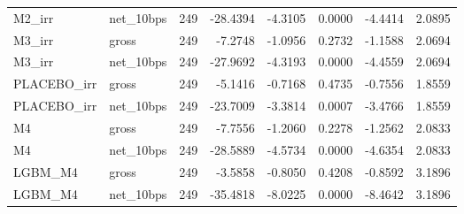\begin{tabular}{llrrrrrr}
M2\_irr & net\_10bps & 249 & -28.4394 & -4.3105 & 0.0000 & -4.4414 & 2.0895 \\
M3\_irr & gross & 249 & -7.2748 & -1.0956 & 0.2732 & -1.1588 & 2.0694 \\
M3\_irr & net\_10bps & 249 & -27.9692 & -4.3193 & 0.0000 & -4.4559 & 2.0694 \\
PLACEBO\_irr & gross & 249 & -5.1416 & -0.7168 & 0.4735 & -0.7556 & 1.8559 \\
PLACEBO\_irr & net\_10bps & 249 & -23.7009 & -3.3814 & 0.0007 & -3.4766 & 1.8559 \\
M4 & gross & 249 & -7.7556 & -1.2060 & 0.2278 & -1.2562 & 2.0833 \\
M4 & net\_10bps & 249 & -28.5889 & -4.5734 & 0.0000 & -4.6354 & 2.0833 \\
LGBM\_M4 & gross & 249 & -3.5858 & -0.8050 & 0.4208 & -0.8592 & 3.1896 \\
LGBM\_M4 & net\_10bps & 249 & -35.4818 & -8.0225 & 0.0000 & -8.4642 & 3.1896 \\
\bottomrule
\end{tabular}
